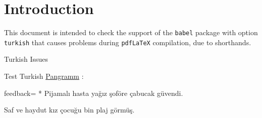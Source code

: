 \documentclass{article}
\def\myquestiontext{ \underline{Pangramm} :}
\def\pangramme{Pijamal\i\ hasta ya\u{g}\i z \c{s}of\"ore \c{c}abucak 
  g\"uvendi.}
\def\pangrammeother{Saf ve haydut k\i z \c{c}ocu\u{g}u bin plaj 
  g\"orm\"u\c{s}.}
\def\myfeedback{}
\def\myquestiontext{ \underline{Pangramm} :}
\def\pangramme{Pijamalı hasta yağız şoföre çabucak güvendi.}
\def\pangrammeother{Saf ve haydut kız çocuğu bin plaj görmüş.}
\def\myfeedback{}
\begin{document}
\section*{Introduction}

This document is intended to check the support of the \texttt{babel} package 
with option \texttt{turkish} that causes problems during \texttt{pdfLaTeX} 
compilation, due to shorthands.

\begin{quiz}[points=1.0]{Turkish Issues}
\shorthandoff{=:!}%
\begin{multi}[feedback={}]{Test Turkish}
\myquestiontext
\item[feedback={\myfeedback}]* \pangramme
\item \pangrammeother
\end{multi}
\end{quiz}
\end{document}

